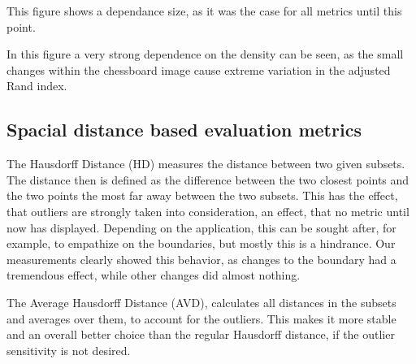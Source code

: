 \documentclass[journal]{IEEEtran}
\begin{document}
This figure shows a dependance size, as it was the case for all metrics until this point.


In this figure a very strong dependence on the density can be seen, as the small changes within the chessboard image cause extreme variation in the adjusted Rand index.





\subsection{Spacial distance based evaluation metrics}

The Hausdorff Distance (HD) measures the distance between two given subsets. The distance then is defined as the difference between the two closest points and the two points the most far away between the two subsets. This has the effect, that outliers are strongly taken into consideration, an effect, that no metric until now has displayed. Depending on the application, this can be sought after, for example, to empathize on the boundaries, but mostly this is a hindrance. Our measurements clearly showed this behavior, as changes to the boundary had a tremendous effect, while other changes did almost nothing.

The Average Hausdorff Distance (AVD), calculates all distances in the subsets and averages over them, to account for the outliers. This makes it more stable and an overall better choice than the regular Hausdorff distance, if the outlier sensitivity is not desired.

\hspace{2in}
\end{document}
